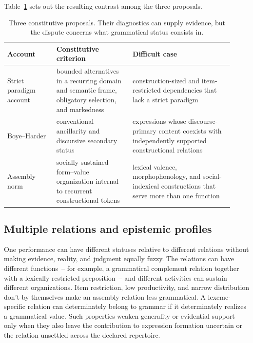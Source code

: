 \documentclass[12pt,letterpaper]{article}
\begin{document}
Table~\ref{tab:constitutive-accounts} sets out the resulting contrast among the
three proposals.
\begin{table}[ht]
\centering
\scriptsize
\setlength{\tabcolsep}{3pt}
\begin{tabular}{@{}p{0.20\linewidth}p{0.31\linewidth}p{0.41\linewidth}@{}}
\toprule
\textbf{Account} & \textbf{Constitutive criterion} & \textbf{Difficult case} \\
\midrule
Strict paradigm account & bounded alternatives in a recurring domain and semantic frame, obligatory selection, and markedness & construction-sized and item-restricted dependencies that lack a strict paradigm \\
Boye--Harder & conventional ancillarity and discursive secondary status & expressions whose discourse-primary content coexists with independently supported constructional relations \\
Assembly norm & socially sustained form--value organization internal to recurrent constructional tokens & lexical valence, morphophonology, and social-indexical constructions that serve more than one function \\
\bottomrule
\end{tabular}
\caption{Three constitutive proposals. Their diagnostics can supply evidence, but
the dispute concerns what grammatical status consists in.}
\label{tab:constitutive-accounts}
\end{table}

\subsection{Multiple relations and epistemic profiles}
\label{sec:profiles}

One performance can have different statuses relative to different relations
without making evidence, reality, and judgment equally fuzzy. The relations can
have different functions~-- for example, a grammatical complement relation
together with a lexically restricted preposition~-- and different activities can
sustain different organizations. Item restriction, low productivity, and narrow
distribution don't by themselves make an assembly relation less grammatical. A
lexeme-specific relation can determinately belong to grammar if it determinately
realizes a grammatical value. Such properties weaken generality or evidential
support only when they also leave the contribution to expression formation
uncertain or the relation
unsettled across the declared repertoire.
\end{document}
